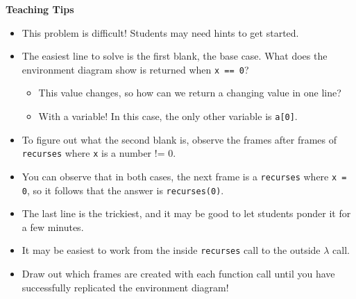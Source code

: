 \begin{guide}
\begin{blocksection}
\vspace{5mm}
\textbf{Teaching Tips}
\begin{itemize}
\item This problem is difficult! Students may need hints to get started.
\item The easiest line to solve is the first blank, the base case. What does the environment diagram show is returned when \lstinline{x == 0}?
\begin{itemize}
\item This value changes, so how can we return a changing value in one line?
\item With a variable! In this case, the only other variable is \lstinline{a[0]}.
\end{itemize}
\item To figure out what the second blank is, observe the frames after frames of \lstinline{recurses} where \lstinline{x} is a number != 0.
\item You can observe that in both cases, the next frame is a \lstinline{recurses} where \lstinline{x = 0}, so it follows that the answer is \lstinline{recurses(0)}.
\item The last line is the trickiest, and it may be good to let students ponder it for a few minutes.
\item It may be easiest to work from the inside \lstinline{recurses} call to the outside $\lambda$ call.
\item Draw out which frames are created with each function call until you have successfully replicated the environment diagram!
\end{itemize}
\end{blocksection}
\end{guide}
